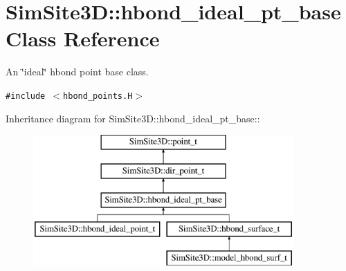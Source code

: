 \section{SimSite3D::hbond\_\-ideal\_\-pt\_\-base Class Reference}
\label{classSimSite3D_1_1hbond__ideal__pt__base}
An \char`\"{}ideal\char`\"{} hbond point base class.  


{\tt \#include $<$hbond\_\-points.H$>$}

Inheritance diagram for SimSite3D::hbond\_\-ideal\_\-pt\_\-base::\begin{figure}[H]
\begin{center}
\leavevmode
\includegraphics[height=5cm]{classSimSite3D_1_1hbond__ideal__pt__base}
\end{center}
\end{figure}
